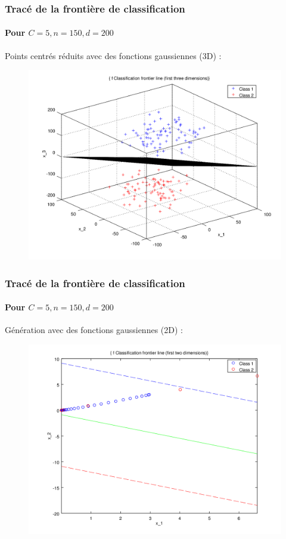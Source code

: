 \documentclass{beamer}
\begin{document}
\begin{frame}
\frametitle{Tracé de la frontière de classification}
\framesubtitle{Pour $C = 5, n = 150, d = 200$}

Points centrés réduits avec des fonctions gaussiennes (3D) :

         \begin{figure}
         \centering
         \includegraphics[scale=0.4]{images/plane4.png}
         \end{figure}

\end{frame}

\begin{frame}
\frametitle{Tracé de la frontière de classification}
\framesubtitle{Pour $C = 5, n = 150, d = 200$}

Génération avec des fonctions gaussiennes (2D) :

         \begin{figure}
         \centering
         \includegraphics[scale=0.4]{images/line5.png}
         \end{figure}

\end{frame}
\end{document}
